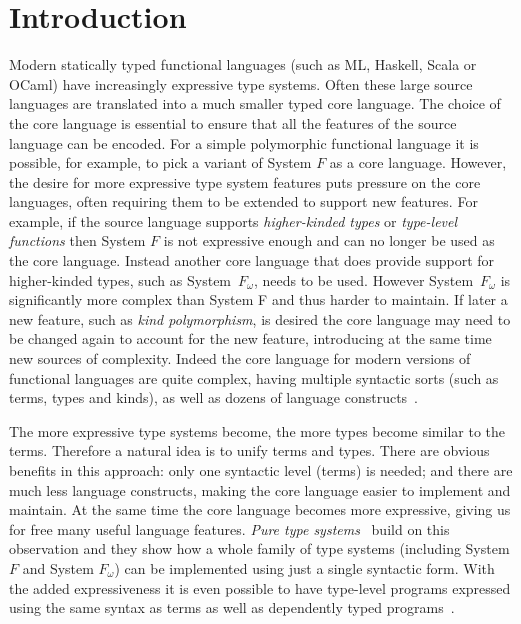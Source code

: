 \section{Introduction}

Modern statically typed functional languages (such as ML, Haskell,
Scala or OCaml) have increasingly expressive type systems. Often these
large source languages are translated into a much smaller typed core
language. The choice of the core language is essential to ensure that
all the features of the source language can be encoded. For a simple
polymorphic functional language it is possible, for example, to pick a
variant of System $F$ as a core language. However, the desire for more
expressive type system features puts pressure on the core languages,
often requiring them to be extended to support new features. 
For example, if the source language supports \emph{higher-kinded types} or
\emph{type-level functions} then System $F$ is not expressive enough
and can no longer be used as the core language. Instead another core
language that does provide support for higher-kinded types, such as
System~$F_{\omega}$, needs to be used.  However System~$F_{\omega}$ is
significantly more complex than System F and thus harder to
maintain. If later a new feature, such as \emph{kind polymorphism}, is
desired the core language may need to be changed again to account for
the new feature, introducing at the same time new sources of
complexity. Indeed the core language for modern versions of 
functional languages are quite complex, having multiple syntactic 
sorts (such as terms, types and kinds), as well as dozens of 
language constructs~\cite{}. 

The more expressive type systems become, the more types become similar
to the terms. Therefore a natural idea is to unify terms and
types. There are obvious benefits in this approach: only one syntactic
level (terms) is needed; and there are much less language constructs,
making the core language easier to implement and maintain. At the same
time the core language becomes more expressive, giving us for free
many useful language features. \emph{Pure type systems}~\cite{} build
on this observation and they show how a whole family of type systems
(including System $F$ and System $F_{\omega}$) can be implemented
using just a single syntactic form. With the added expressiveness it
is even possible to have type-level programs expressed using the same
syntax as terms as well as dependently typed programs~\cite{}.

